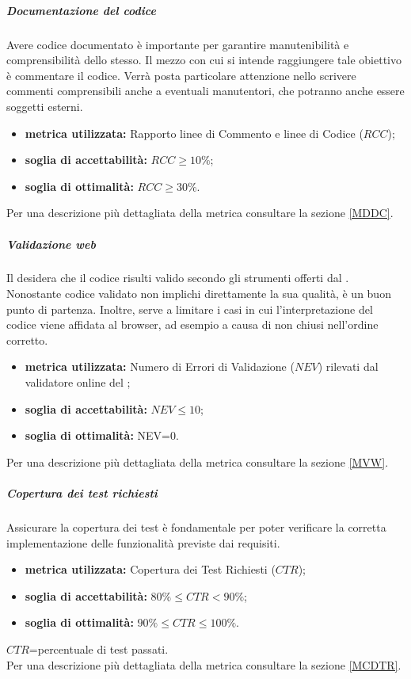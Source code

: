 \subparagraph{Documentazione del codice}
\label{ODDC}
Avere codice documentato è importante per garantire manutenibilità e comprensibilità dello stesso. Il mezzo con cui si intende raggiungere tale obiettivo è commentare il codice. Verrà posta particolare attenzione nello scrivere commenti comprensibili anche a eventuali manutentori, che potranno anche essere soggetti esterni.

\begin{itemize}
	\item \textbf{metrica utilizzata:} Rapporto linee di Commento e linee di Codice ($RCC$);
	\item \textbf{soglia di accettabilità:} $RCC\geq 10\%$;
	\item \textbf{soglia di ottimalità:} $RCC \geq 30\%$.
\end{itemize}
Per una descrizione più dettagliata della metrica consultare la sezione \ref{MDDC}.


\subparagraph{Validazione web}
\label{OVW}
Il  desidera che il codice  risulti valido secondo gli strumenti offerti dal . Nonostante codice validato non implichi direttamente la sua qualità, è un buon punto di partenza. Inoltre, serve a limitare i casi in cui l'interpretazione del codice  viene affidata al browser, ad esempio a causa di  non chiusi nell'ordine corretto.
\begin{itemize}
	\item \textbf{metrica utilizzata:} Numero di Errori di Validazione ($NEV$) rilevati dal validatore online del ;
	\item \textbf{soglia di accettabilità:} $NEV\leq10$;
	\item \textbf{soglia di ottimalità:} NEV=0.
\end{itemize}
Per una descrizione più dettagliata della metrica consultare la sezione \ref{MVW}.

\subparagraph{Copertura dei test richiesti}
\label{OCDTR}
Assicurare la copertura dei test è fondamentale per poter verificare la corretta implementazione delle funzionalità previste dai requisiti. 
\begin{itemize}
	\item \textbf{metrica utilizzata:} Copertura dei Test Richiesti ($CTR$);
	\item \textbf{soglia di accettabilità:} $80\%\leq CTR<90\%$;
	\item \textbf{soglia di ottimalità:} $90\%\leq CTR \leq 100\%$.
\end{itemize}
$CTR$=percentuale di test passati.\\
Per una descrizione più dettagliata della metrica consultare la sezione \ref{MCDTR}.

